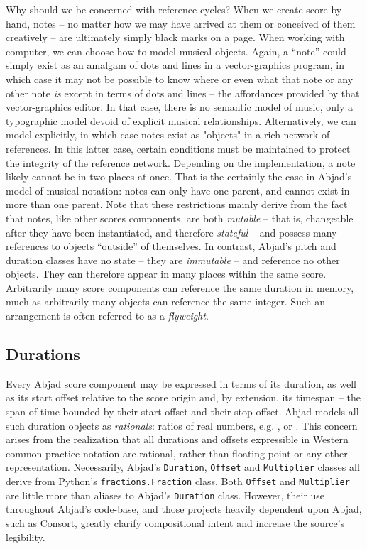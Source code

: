 \noindent Why should we be concerned with reference cycles? When we create
score by hand, notes -- no matter how we may have arrived at them or conceived
of them creatively -- are ultimately simply black marks on a page. When working
with computer, we can choose how to model musical objects. Again, a
\enquote{note} could simply exist as an amalgam of dots and lines in a
vector-graphics program, in which case it may not be possible to know where or
even what that note or any other note \emph{is} except in terms of dots and
lines -- the affordances provided by that vector-graphics editor. In that case,
there is no semantic model of music, only a typographic model devoid of
explicit musical relationships. Alternatively, we can model explicitly, in
which case notes exist as "objects" in a rich network of references. In this
latter case, certain conditions must be maintained to protect the integrity of
the reference network. Depending on the implementation, a note likely cannot
be in two places at once. That is the certainly the case in Abjad's model of
musical notation: notes can only have one parent, and cannot exist in more than
one parent. Note that these restrictions mainly derive from the fact that
notes, like other scores components, are both \emph{mutable} -- that is,
changeable after they have been instantiated, and therefore \emph{stateful} --
and possess many references to objects \enquote{outside} of themselves. In
contrast, Abjad's pitch and duration classes have no state -- they are
\emph{immutable} -- and reference no other objects. They can therefore appear
in many places within the same score. Arbitrarily many score components can
reference the same duration in memory, much as arbitrarily many objects can
reference the same integer. Such an arrangement is often referred to as a
\emph{flyweight}\cite{gamma1994design}.

\subsection{Durations}
\label{ssec:durations}

Every Abjad score component may be expressed in terms of its duration, as well
as its start offset relative to the score origin and, by extension, its
timespan -- the span of time bounded by their start offset and their stop
offset. Abjad models all such duration objects as \emph{rationals}: ratios of
real numbers, e.g. ,  or . This concern
arises from the realization that all durations and offsets expressible in
Western common practice notation are rational, rather than floating-point or
any other representation. Necessarily, Abjad's \texttt{Duration},
\texttt{Offset} and \texttt{Multiplier} classes all derive from Python's
\texttt{fractions.Fraction} class. Both \texttt{Offset} and \texttt{Multiplier}
are little more than aliases to Abjad's \texttt{Duration} class. However, their
use throughout Abjad's code-base, and those projects heavily dependent upon
Abjad, such as Consort, greatly clarify compositional intent and increase the
source's legibility.

